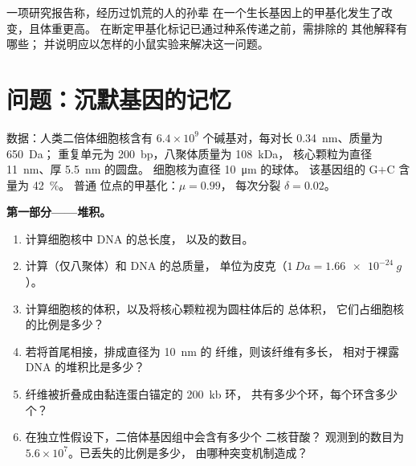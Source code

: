 \begin{exercise}[$\star\star\star$]\label{exo:b3:chromatin-epigenetics:12}
一项研究报告称，经历过饥荒的人的孙辈
在一个生长基因上的甲基化发生了改变，且体重更高。
在断定甲基化标记已通过种系传递之前，需排除的
其他解释有哪些；
并说明应以怎样的小鼠实验来解决这一问题。
\end{exercise}

\section{问题：沉默基因的记忆}

\begin{problem}
\label{pb:b3:chromatin-epigenetics:1}
数据：人类二倍体细胞核含有 $6.4\times 10^{9}$ 个碱基对，每对长 \qty{0.34}{nm}、质量为 \qty{650}{Da}；
重复单元为 \qty{200}{bp}，八聚体质量为 \qty{108}{kDa}，
核心颗粒为直径 \qty{11}{nm}、厚 \qty{5.5}{nm} 的圆盘。
细胞核为直径 \qty{10}{\micro m} 的球体。
该基因组的 G$+$C 含量为 \qty{42}{\%}。
普通  位点的甲基化：$\mu = 0.99$，
每次分裂 $\delta = 0.02$。

\medskip
\noindent\textbf{第一部分——堆积。}
\begin{enumerate}
  \item 计算细胞核中 DNA 的总长度，
        以及的数目。
  \item 计算（仅八聚体）和 DNA 的总质量，
        单位为皮克（$\qty{1}{Da} = \qty{1.66e-24}{g}$）。
  \item 计算细胞核的体积，以及将核心颗粒视为圆柱体后的
        总体积，
        它们占细胞核的比例是多少？
  \item 若将首尾相接，排成直径为 \qty{10}{nm} 的
        纤维，则该纤维有多长，
        相对于裸露 DNA 的堆积比是多少？
  \item 纤维被折叠成由黏连蛋白锚定的 \qty{200}{kb} 环，
        共有多少个环，每个环含多少个？
  \item 在独立性假设下，二倍体基因组中会含有多少个  二核苷酸？
        观测到的数目为
        $5.6\times 10^{7}$。已丢失的比例是多少，
        由哪种突变机制造成？
\end{enumerate}


\end{problem}
